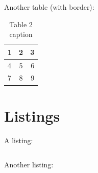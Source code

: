 Another table (with border):
\begin{table}[H]
    \centering
    \begin{tabular}{ | l | c | r | }\hline
        1 & 2 & 3 \\\hline
        4 & 5 & 6 \\\hline
        7 & 8 & 9 \\\hline
    \end{tabular}
    \caption{Table 2 caption}\label{tables_table2}
\end{table}

\section{Listings}

A listing:
\begin{code}
    \label{listings_listing1}
    \inputminted{yaml}{other/listings/examples/SimpleDockerCompose.yml}
\end{code}

Another listing:
\begin{code}
    \label{listings_listing2}
    \inputminted{bash}{other/listings/examples/SimplePythonScript.py}
\end{code}
